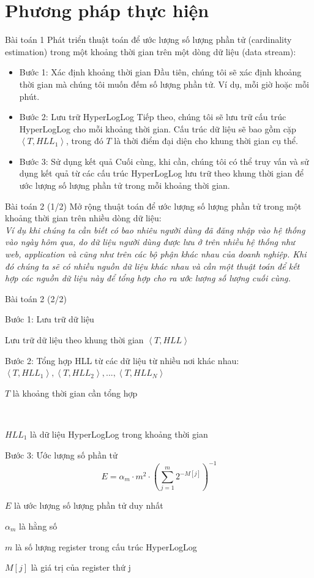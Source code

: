 \documentclass[10pt]{beamer}
\newcommand{\SubItem}[1]{
    {\setlength\itemindent{15pt} \item[-] #1}
}
\begin{document}
\section{Phương pháp thực hiện}
\begin{frame}[fragile]{Bài toán 1}
Phát triển thuật toán để ước lượng số lượng phần tử (cardinality estimation) trong 
một khoảng thời gian trên một dòng dữ liệu (data stream): 

\begin{itemize}
  \item Bước 1: Xác định khoảng thời gian
  Đầu tiên, chúng tôi sẽ xác định khoảng thời gian mà chúng tôi muốn đếm số lượng 
  phần tử. Ví dụ, mỗi giờ hoặc mỗi phút.
  \item Bước 2: Lưu trữ HyperLogLog
  Tiếp theo, chúng tôi sẽ lưu trữ cấu trúc HyperLogLog cho mỗi khoảng thời gian. 
  Cấu trúc dữ liệu sẽ bao gồm cặp $\left< T, HLL_1\right>$, trong đó $T$ là 
  thời điểm đại diện cho khung thời gian cụ thể.
  \item Bước 3: Sử dụng kết quả
  Cuối cùng, khi cần, chúng tôi có thể truy vấn và sử dụng kết quả từ các cấu trúc 
  HyperLogLog lưu trữ theo khung thời gian để ước lượng số lượng phần tử trong 
  mỗi khoảng thời gian.
\end{itemize}
\end{frame}
\begin{frame}[fragile]{Bài toán 2 (1/2)}
  Mở rộng thuật toán để ước lượng số lượng phần tử trong một khoảng thời gian trên nhiều dòng dữ liệu:\\
\vspace{0.1cm}
  \textit{ Ví dụ khi chúng ta cần biết có bao nhiêu người dùng đã đăng nhập vào hệ thống vào ngày hôm qua, do dữ liệu người dùng được lưu ở trên nhiều hệ thống như web, application và cũng như trên các bộ phận khác nhau của doanh nghiệp. Khi đó chúng ta sẽ có nhiều nguồn dữ liệu khác nhau và cần một thuật toán để kết hợp các nguồn dữ liệu này để tổng hợp cho ra ước lượng
  số lượng cuối cùng.}

\end{frame}
\begin{frame}[fragile]{Bài toán 2 (2/2)}
  \begin{itemize}
      \item Bước 1: Lưu trữ dữ liệu
      \SubItem{Lưu trữ dữ liệu theo khung thời gian $\left< T, HLL\right>$}
      \item Bước 2: Tổng hợp HLL từ các dữ liệu từ nhiều nơi khác nhau:\\
      $\left< T, HLL_1\right>, \left< T, HLL_2\right>,...,\left< T, HLL_N\right>$\\
      \SubItem{$T$ là khoảng thời gian cần tổng hợp} \\
      \SubItem{$HLL_1$ là dữ liệu HyperLogLog trong khoảng thời gian}
      \item Bước 3: Ước lượng số phần tử
      \[E = \alpha_m \cdot m^2 \cdot \left( \sum_{j=1}^{m} 2^{-M[j]} \right)^{-1}\]
      \SubItem{$E$ là ước lượng số lượng phần tử duy nhất}
      \SubItem{$\alpha_m$ là hằng số}
      \SubItem{$m$ là số lượng register trong cấu trúc HyperLogLog}
      \SubItem{$M[j]$ là giá trị của register thứ j}
\end{itemize}
\end{frame}
\end{document}
